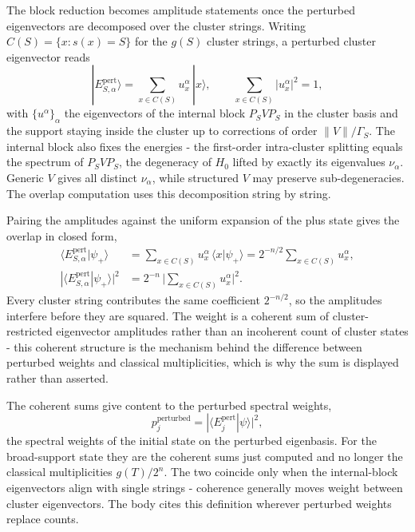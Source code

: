 The block reduction becomes amplitude statements once the perturbed eigenvectors are decomposed over the cluster strings. Writing $C(S) = \{ x : s(x) = S \}$ for the $g(S)$ cluster strings, a perturbed cluster eigenvector reads
\begin{equation*}
|E_{S,\alpha}^{\mathrm{pert}}\rangle = \sum_{x \in C(S)} u^{\alpha}_x \, |x\rangle , \qquad
\sum_{x \in C(S)} |u^{\alpha}_x|^2 = 1 ,
\end{equation*}
with $\{u^\alpha\}_\alpha$ the eigenvectors of the internal block $P_S V P_S$ in the cluster basis and the support staying inside the cluster up to corrections of order $\|V\|/\Gamma_S$. The internal block also fixes the energies - the first-order intra-cluster splitting equals the spectrum of $P_S V P_S$, the degeneracy of $H_0$ lifted by exactly its eigenvalues $\nu_\alpha$. Generic $V$ gives all distinct $\nu_\alpha$, while structured $V$ may preserve sub-degeneracies. The overlap computation uses this decomposition string by string.

Pairing the amplitudes against the uniform expansion of the plus state gives the overlap in closed form,
\begin{align*}
\langle E_{S,\alpha}^{\mathrm{pert}} | \psi_+ \rangle
&= \sum_{x \in C(S)} u^{\alpha}_x \, \langle x | \psi_+ \rangle
= 2^{-n/2} \sum_{x \in C(S)} u^{\alpha}_x , \\
|\langle E_{S,\alpha}^{\mathrm{pert}} | \psi_+ \rangle|^2
&= 2^{-n} \, \Big| \sum_{x \in C(S)} u^{\alpha}_x \Big|^2 .
\end{align*}
Every cluster string contributes the same coefficient $2^{-n/2}$, so the amplitudes interfere before they are squared. The weight is a coherent sum of cluster-restricted eigenvector amplitudes rather than an incoherent count of cluster states - this coherent structure is the mechanism behind the difference between perturbed weights and classical multiplicities, which is why the sum is displayed rather than asserted.

The coherent sums give content to the perturbed spectral weights,
\begin{equation}\label{def:perturbed-spectral-weights}
p_j^{\mathrm{perturbed}} = |\langle E_j^{\mathrm{pert}} | \psi \rangle|^2 ,
\end{equation}
the spectral weights of the initial state on the perturbed eigenbasis. For the broad-support state they are the coherent sums just computed and no longer the classical multiplicities $g(T)/2^n$. The two coincide only when the internal-block eigenvectors align with single strings - coherence generally moves weight between cluster eigenvectors. The body cites this definition wherever perturbed weights replace counts.

